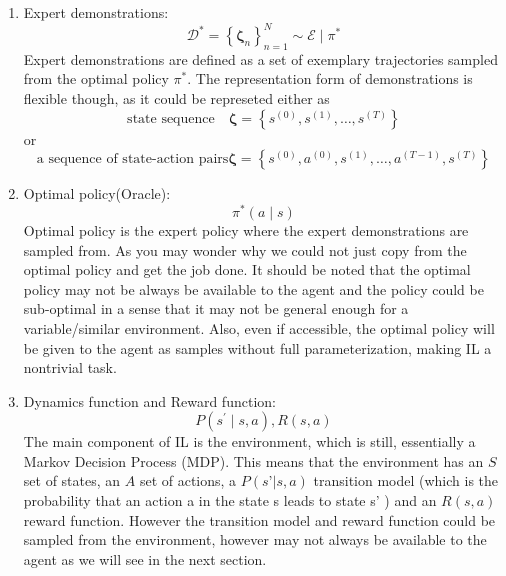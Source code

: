 \documentclass[11pt]{article}
\begin{document}
\begin{enumerate}
    \item Expert demonstrations: 
    $$
\mathcal{D}^{*}=\left\{\boldsymbol{\zeta}_{n}\right\}_{n=1}^{N} \sim \mathcal{E} \mid \pi^{*}
$$
    Expert demonstrations are defined as a set of exemplary trajectories sampled from the optimal policy $\pi^{*}$. The representation form of demonstrations is flexible though, as it could be represeted either as 
    $$\text{state sequence}\quad \boldsymbol{\zeta}=\left\{s^{(0)}, s^{(1)}, \ldots, s^{(T)}\right\}$$  
    or 
    $$\text{a sequence of state-action pairs}\boldsymbol{\zeta}=\left\{s^{(0)}, a^{(0)}, s^{(1)}, \ldots, a^{(T-1)}, s^{(T)}\right\}$$
    \item Optimal policy(Oracle): 
    $$
    \pi^{*}(a \mid s)
    $$
    Optimal policy is the expert policy where the expert demonstrations are sampled from. As you may wonder why we could not just copy from the optimal policy and get the job done.
    It should be noted that the optimal policy may not be always be available to the agent and the policy could be sub-optimal in a sense that it may not be general enough for a variable/similar environment. Also, even if accessible, the optimal policy will be given to the agent as samples without full parameterization, making IL a nontrivial task.
    
    \item Dynamics function and Reward function: 
    $$
    P\left(s^{\prime} \mid s, a\right), R\left(s, a\right)
    $$
    The main component of IL is the environment, which is still, essentially a Markov Decision Process (MDP). This means that the environment has an $S$ set of states, an $A$ set of actions, a $P(s’|s,a)$ transition model (which is the probability that an action a in the state s leads to state s’ ) and an $R(s,a)$ reward function. However the transition model and reward function could be sampled from the environment, however may not always be available to the agent as we will see in the next section.
\end{enumerate}
\end{document}
